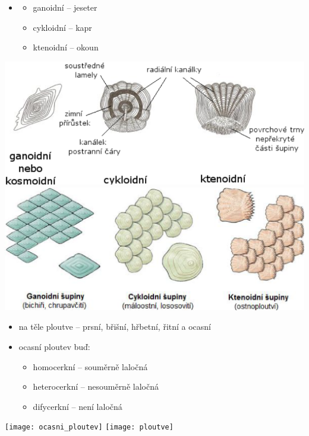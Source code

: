 \documentclass{article}
\begin{document}
\hspace{-0.03185\textwidth}\begin{minipage}{0.275\textwidth}\raggedleft
  \begin{itemize}
    \item[]
    \begin{itemize}
      \item ganoidní -- jeseter
      \item cykloidní -- kapr
      \item ktenoidní -- okoun
    \end{itemize}
  \end{itemize}
\end{minipage}
\noindent\begin{minipage}{0.715\textwidth}
  \includegraphics[width=0.49\linewidth]{šupiny}
  \includegraphics[width=0.49\linewidth]{šupiny_dva}
\end{minipage}

\hspace{-0.03185\textwidth}\begin{minipage}{0.535\textwidth}\raggedleft
  \begin{itemize}
    \item na těle ploutve -- prsní, břišní, hřbetní, řitní a ocasní
    \item ocasní ploutev buď:
    \begin{itemize}
      \item homocerkní -- souměrně laločná
      \item heterocerkní -- nesouměrně laločná
      \item difycerkní -- není laločná
    \end{itemize}
  \end{itemize}
\end{minipage}
\hspace{-0.08\textwidth}\noindent\begin{minipage}{0.455\textwidth}
  \texttt{[image: ocasni\_ploutev]}
  \hspace{0.1\textwidth}
  \texttt{[image: ploutve]}
\end{minipage}
\end{document}
